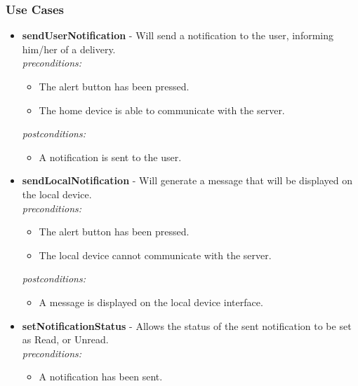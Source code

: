 \documentclass[a4paper,12pt]{article}
\begin{document}
	{\noindent}
	
	\newpage
	\subsubsection{Use Cases}
	
	\begin{itemize}
		\item \textbf{sendUserNotification} - Will send a notification to the user, informing him/her of a delivery.\\[0.5cm]
		\textit{preconditions:}
		\begin{itemize}
			\item The alert button has been pressed.
			\item The home device is able to communicate with the server.
		\end{itemize}
		
		\textit{postconditions:}
		\begin{itemize}
			\item A notification is sent to the user.\\[0.5cm]
		\end{itemize}
		
		\item \textbf{sendLocalNotification} -  Will generate a message that will be displayed on the local device.\\[0.5cm]
		\textit{preconditions:}
		\begin{itemize}
			\item The alert button has been pressed.
			\item The local device cannot communicate with the server.
		\end{itemize}
		
		\textit{postconditions:}
		\begin{itemize}
			\item A message is displayed on the local device interface.\\[0.5cm]
		\end{itemize}
		
		\item \textbf{setNotificationStatus} -  Allows the status of the sent notification to be set as Read, or Unread.\\[0.5cm]
		\textit{preconditions:}
		\begin{itemize}
			\item A notification has been sent.
		\end{itemize}
		

\end{itemize}
\end{document}
